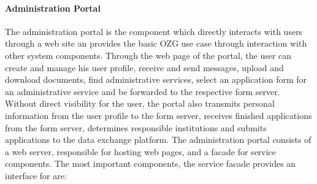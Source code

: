 \documentclass[
     12pt,         %
     a4paper,      %
     BCOR=10mm,version=first,     %
     DIV=14,version=first,        %
     ]{scrreprt}
\begin{document}
\paragraph{Administration Portal}
The administration portal is the component which directly interacts with users through a web site an provides the basic OZG use case through interaction with other system components. Through the web page of the portal, the user can create and manage his user profile, receive and send messages, upload and download documents, find administrative services, select an application form for an administrative service and be forwarded to the respective form server. Without direct visibility for the user, the portal also transmits personal information from the user profile to the form server, receives finished applications from the form server, determines responsible institutions and submits applications to the data exchange platform.
The administration portal consists of a web server, responsible for hosting web pages, and a facade for service components. The most important components, the service facade provides an interface for are:
\end{document}
